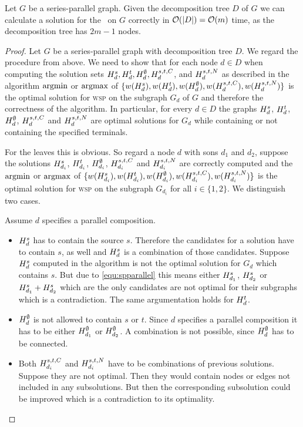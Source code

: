 \begin{theorem}
	\label{thm:wspsp}
	Let $G$ be a series-parallel graph. Given the decomposition tree $D$ of $G$ we can calculate a solution for the \WSP\ on $G$ correctly in $\mathcal{O}(|D|) = \mathcal{O}(m)$ time, as the decomposition tree has $2m - 1$ nodes.
\end{theorem}
\begin{proof}
	Let $G$ be a series-parallel graph with decomposition tree $D$. We regard the procedure from above. We need to show that for each node $d \in D$ when computing the solution sets $H_{d}^{s}, H_{d}^{t}, H_{d}^{\emptyset}, H_{d}^{s,t,C}$, and $H_{d}^{s,t,N}$ as described in the algorithm $\operatorname*{argmin}$ or $\operatorname*{argmax}$ of $\{ w(H_{d}^{s}), w(H_{d}^{t}), w(H_{d}^{\emptyset}), w(H_{d}^{s,t,C}), w(H_{d}^{s,t,N}) \}$ is the optimal solution for \textsc{wsp} on the subgraph $G_d$ of $G$ and therefore the correctness of the algorithm. In particular, for every $d \in D$ the graphs $H_{d}^{s}$, $H_{d}^{t}$, $H_{d}^{\emptyset}$, $H_{d}^{s,t,C}$ and $H_{d}^{s,t,N}$ are optimal solutions for $G_d$ while containing or not containing the specified terminals.\medskip
	
	For the leaves this is obvious. So regard a node $d$ with sons $d_1$ and $d_2$, suppose the solutions $H_{d_i}^{s}$, $H_{d_i}^{t}$, $H_{d_i}^{\emptyset}$, $H_{d_i}^{s,t,C}$ and $H_{d_i}^{s,t,N}$ are correctly computed and the $\operatorname*{argmin}$ or $\operatorname*{argmax}$ of $\{ w(H_{d_i}^{s}), w(H_{d_i}^{t}), w(H_{d_i}^{\emptyset}), w(H_{d_i}^{s,t,C}), w(H_{d_i}^{s,t,N}) \}$ is the optimal solution for \textsc{wsp} on the subgraph $G_{d_i}$ for all $i \in \{1, 2\}$. We distinguish two cases.\medskip 
	
	Assume $d$ specifies a parallel composition. 
	\begin{itemize}
		\item $H_{d}^{s}$ has to contain the source $s$. Therefore the candidates for a solution have to contain $s$, as well and $H_{d}^{s}$ is a combination of those candidates. Suppose $H_{d}^{s}$ computed in the algorithm is not the optimal solution for $G_d$ which contains $s$. But due to \eqref{equ:spparallel} this means either $H_{d_1}^{s}$, $H_{d_2}^{s}$ or $H_{d_1}^{s} + H_{d_2}^{s}$ which are the only candidates are not optimal for their subgraphs which is a contradiction. The same argumentation holds for $H_{d}^{t}$.
		\item $H_{d}^{\emptyset}$ is not allowed to contain $s$ or $t$. Since $d$ specifies a parallel composition it has to be  either $H_{d_1}^{\emptyset}$ or $H_{d_2}^{\emptyset}$. A combination is not possible, since $H_{d}^{\emptyset}$ has to be connected.
		\item Both $H_{d_i}^{s,t,C}$ and $H_{d_i}^{s,t,N}$ have to be combinations of previous solutions. Suppose they are not optimal. Then they would contain nodes or edges not included in any subsolutions. But then the corresponding subsolution could be improved which is a contradiction to its optimality.
	\end{itemize}


\end{proof}
